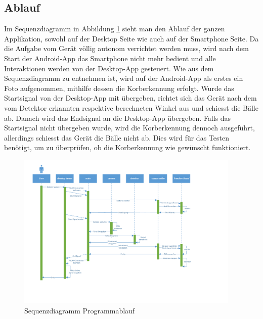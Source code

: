 \subsection{Ablauf}

Im Sequenzdiagramm in Abbildung \ref{abb:SequenzdiagrammSoftware} sieht man den Ablauf der ganzen Applikation, sowohl auf der Desktop 
Seite wie auch auf der Smartphone Seite. Da die Aufgabe vom Gerät völlig autonom verrichtet 
werden muss, wird nach dem Start der Android-App das Smartphone nicht mehr bedient 
und alle Interaktionen werden von der Desktop-App gesteuert. 
Wie aus dem Sequenzdiagramm zu entnehmen ist, wird auf der Android-App als erstes ein 
Foto aufgenommen, mithilfe dessen die Korberkennung erfolgt. 
Wurde das Startsignal von der Desktop-App mit übergeben, richtet sich das Gerät nach dem vom Detektor erkannten 
respektive berechneten Winkel aus und schiesst die Bälle ab. 
Danach wird das Endsignal an die Desktop-App übergeben.
Falls das Startsignal nicht übergeben wurde, wird die Korberkennung dennoch ausgeführt, 
allerdings schiesst das Gerät die Bälle nicht ab. Dies wird für das Testen benötigt, um 
zu überprüfen, ob die Korberkennung wie gewünscht funktioniert.


\begin{figure}[h!]
	\includegraphics[width=0.95\textwidth,clip,trim=12mm 35mm 55mm 5mm]
	{Enddokumentation/Bilder/Sequenzdiagramm_PREN2_v1.pdf}
	\centering
	\caption{Sequenzdiagramm Programmablauf}
	\label{abb:SequenzdiagrammSoftware}
\end{figure}


            
